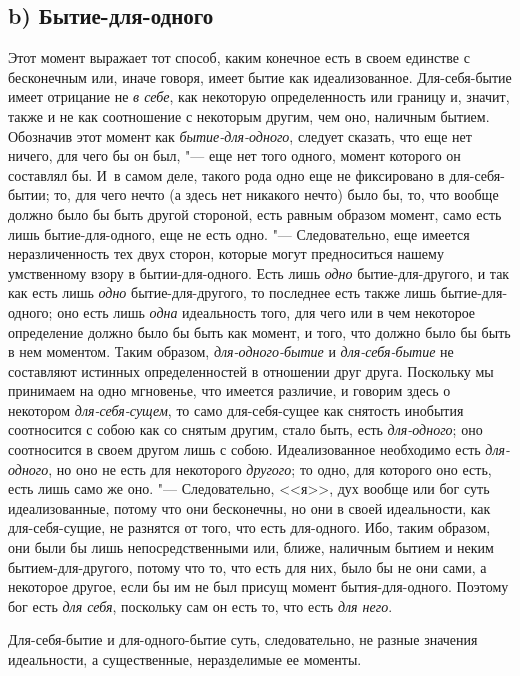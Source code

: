 \subsection[b) Бытие-для-одного]{b) Бытие-для-одного}
Этот момент выражает тот способ, каким конечное есть в своем единстве с
бесконечным или, иначе говоря, имеет бытие как идеализованное.
Для-себя-бытие имеет отрицание не {\em в себе}, как
некоторую определенность или границу и, значит, также и не как соотношение
с некоторым другим, чем оно, наличным бытием. Обозначив этот момент как
{\em бытие-для-одного}, следует сказать, что еще нет
ничего, для чего бы он был, "--- еще нет того одного, момент которого он
составлял бы. И~в самом деле, такого рода одно еще не фиксировано в
для-себя-бытии; то, для чего нечто (а здесь нет никакого нечто) было бы,
то, что вообще должно было бы быть другой стороной, есть равным образом
момент, само есть лишь бытие-для-одного, еще не есть одно. "--- Следовательно,
еще имеется неразличенность тех двух сторон, которые могут предноситься
нашему умственному взору в бытии-для-одного. Есть лишь
{\em одно} бытие-для-другого, и так как есть лишь
{\em одно} бытие-для-другого, то последнее есть также
лишь бытие-для-одного; оно есть лишь {\em одна}
идеальность того, для чего или в чем некоторое определение должно было бы
быть как момент, и того, что должно было бы быть в нем моментом. Таким
образом, {\em для-одного-бытие} и
{\em для-себя-бытие} не составляют истинных
определенностей в отношении друг друга. Поскольку мы принимаем на одно
мгновенье, что имеется различие, и говорим здесь о некотором
{\em для-себя-сущем}, то само для-себя-сущее как
снятость инобытия соотносится с собою как со снятым другим, стало быть,
есть {\em для-одного}; оно соотносится в своем другом
лишь с собою. Идеализованное необходимо есть
{\em для-одного}, но оно не есть для некоторого
{\em другого}; то одно, для которого оно есть, есть
лишь само же оно. "--- Следовательно, <<я>>, дух вообще или бог суть
идеализованные, потому что они бесконечны, но они в своей идеальности, как
для-себя-сущие, не разнятся от того, что есть для-одного. Ибо, таким
образом, они были бы лишь непосредственными или, ближе, наличным бытием и
неким бытием-для-другого, потому что то, что есть для них, было бы не они
сами, а некоторое другое, если бы им не был присущ момент бытия-для-одного.
Поэтому бог есть {\em для себя}, поскольку сам он есть
то, что есть {\em для него}.

Для-себя-бытие и для-одного-бытие суть, следовательно, не разные значения
идеальности, а существенные, неразделимые ее моменты.

